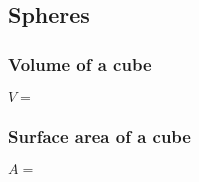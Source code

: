
\subsection{Spheres}

\subsubsection{Volume of a cube}

\(V=\)

\subsubsection{Surface area of a cube}

\(A=\)


